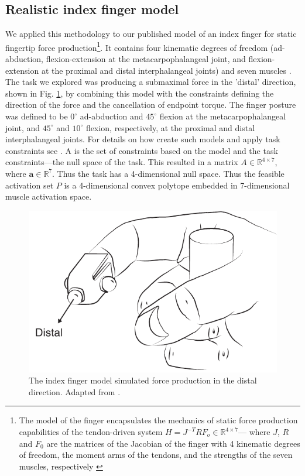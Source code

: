 \subsection*{Realistic index finger model}
\label{ss:finger}
We  applied this methodology to our published model of an index finger for static fingertip force production\footnote{The model of the finger encapsulates the mechanics of static force production capabilities of the tendon-driven system $H=J^{-T}RF_o \in \mathbb{R}^{4 \times 7}$--- where $J$, $R$ and $F_0$ are the matrices of the Jacobian of the finger with 4 kinematic degrees of freedom, the moment arms of the tendons, and the strengths of the seven muscles, respectively \cite{Valero-Cuevas1998Large,Valero-cuevas2015fundamentals}}.
It contains  four kinematic degrees of freedom (ad-abduction, flexion-extension at the metacarpophalangeal joint, and flexion-extension at the proximal and distal interphalangeal joints) and seven muscles  \cite{Valero-Cuevas1998Large}.
The task we explored was producing a submaximal force in the 'distal'  direction, shown  in Fig. \ref{fig:finger}, by combining this model with the constraints defining the direction of the force and the cancellation of endpoint torque.
The finger posture was defined to be $0^\circ$  ad-abduction and $45^\circ$ flexion at the metacarpophalangeal joint, and $45^\circ$ and $10^\circ$ flexion, respectively, at the proximal and distal interphalangeal joints.
For details on how create such models and apply task constraints see \cite{Valero-Cuevas1998Large,valero-cuevas2015fundamentals}.
A is the  set of constraints based on the model and the task constraints---the null space of the task. This resulted in a matrix $A \in \mathbb{R}^{4 \times 7}$, where $\textbf{a} \in \mathbb{R}^7$.
Thus the task has a 4-dimensional null space. Thus the feasible activation set $P$ is a 4-dimensional convex polytope embedded in 7-dimensional muscle activation space.




\begin{figure}[ht]
  \centering
  \includegraphics[]{sections/figs/finger.pdf}
  \caption{The index finger model simulated force production in the distal direction. Adapted from \cite{Valero-Cuevas1998Large}.}
  \label{fig:finger}
\end{figure}


